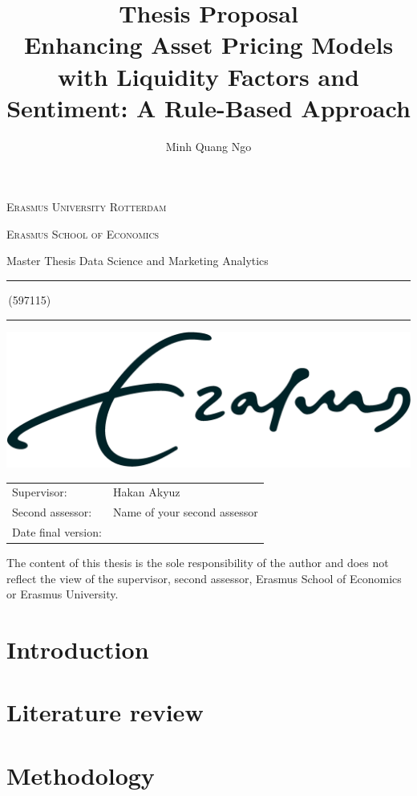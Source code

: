 \documentclass[a4paper,11pt]{article}
\author{Minh Quang Ngo}
\title{Thesis Proposal \\ Enhancing Asset Pricing Models with Liquidity Factors and Sentiment: A Rule-Based Approach}
\newcommand{\studentnumber}{597115}
\newcommand{\program}{Data Science and Marketing Analytics}
\newcommand{\supervisor}{Hakan Akyuz}
\newcommand{\secondassesor}{Name of your second assessor}
\begin{document}
\begin{titlepage}
\makeatletter
\begin{center}
	\textsc{Erasmus University Rotterdam}
	\par \textsc{Erasmus School of Economics}
	\par Master Thesis \program

	\vfill \hrule height .08em \bigskip
	\par\huge\@title\bigskip
	\par\Large\@author\,(\studentnumber)\bigskip
	\hrule height .08em\normalsize
	
	\vfill
	\includegraphics[width=\textwidth,height=0.15\textheight,keepaspectratio]{eur} %
	\vfill
	
	\begin{tabular}{ll}
		\toprule
		Supervisor: & \supervisor\\
		Second assessor: & \secondassesor\\
		Date final version: & \@date\\
		\bottomrule
	\end{tabular}
	
	\vfill
	The content of this thesis is the sole responsibility of the author and does not reflect the view of the supervisor, second assessor, Erasmus School of Economics or Erasmus University.
\end{center}
\makeatother
\end{titlepage}

\section{Introduction}
    
\section{Literature review}
	
\section{Methodology}
     
\end{document}
